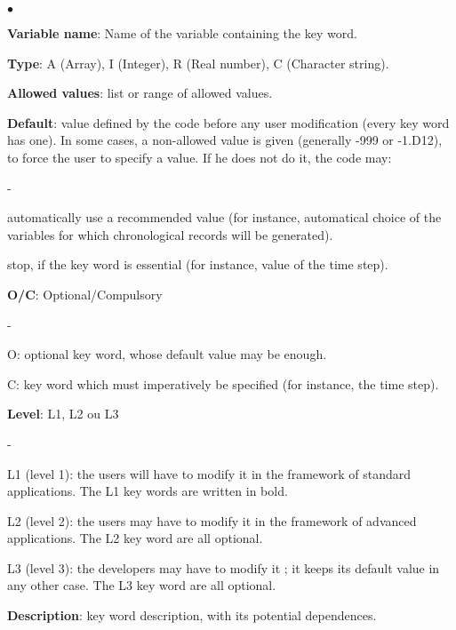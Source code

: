 \begin{list}{$\bullet$}{}
\item \textbf{Variable name}: Name of the variable containing the key word.

\item \textbf{Type}: A (Array), I (Integer), R (Real number), C
      (Character string).

\item \textbf{Allowed values}: list or range of allowed values.

\item \textbf{Default}: value defined by the code before any user
      modification (every key word has one). In some cases, a
      non-allowed value is given (generally -999 or -1.D12), to force the
      user to specify a value. If he does not do it, the code may: 
\begin{list}{-}{}
\item automatically use a recommended value (for instance, automatical
      choice of the variables for which chronological records will be
      generated).

\item stop, if the key word is essential (for instance, value of the
      time step).
\end{list}

\item \textbf{O/C}: Optional/Compulsory
\begin{list}{-}{}
\item O: optional key word, whose default value may be enough.

\item C: key word which must imperatively be specified (for instance,
      the time step).
\end{list}

\item \textbf{Level}: L1, L2 ou L3
\begin{list}{-}{}
\item L1 (level 1): the users will have to modify it in the framework of
      standard applications. The L1 key words are written in bold.

\item L2 (level 2): the users may have to modify it in the framework of
      advanced applications. The L2 key word are all optional.

\item L3 (level 3): the developers may have to modify it ; it keeps its
      default value in any other case. The L3 key word are all optional.
\end{list}

\item \textbf{Description}:  key word description, with its potential
      dependences. 

\end{list}

